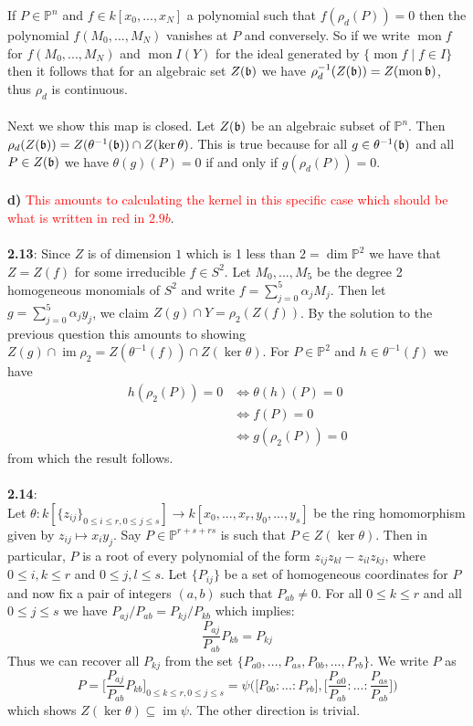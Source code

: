 \documentclass[12pt]{article}
\numberwithin{thm}{subsection}
\numberwithin{defn}{subsection}
\numberwithin{lemma}{subsection}
\numberwithin{example}{subsection}
\numberwithin{notation}{subsection}
\numberwithin{cor}{subsection}
\numberwithin{remark}{subsection}
\numberwithin{condition}{subsection}
\numberwithin{question}{subsection}
\numberwithin{construction}{subsection}
\numberwithin{construction}{subsection}
\numberwithin{construction}{subsection}
\newcommand{\bb}[1]{\mathbb{#1}}
\newcommand{\lto}{\longrightarrow}
\newcommand{\im}{\operatorname{im}}
\begin{document}
%
If $P \in \bb{P}^n$ and $f \in k[x_0,...,x_N]$ a polynomial such that $f(\rho_d(P)) = 0$ then the polynomial $f(M_0,...,M_N)$ vanishes at $P$ and conversely. So if we write $\operatorname{mon}f$ for $f(M_0,...,M_N)$ and $\operatorname{mon}I(Y)$ for the ideal generated by $\lbrace \operatorname{mon}f \mid f \in I \rbrace$ then it follows that for an algebraic set $Z(\frak{b})$ we have $\rho_d^{-1}(Z(\frak{b})) = Z(\operatorname{mon}\frak{b})$, thus $\rho_d$ is continuous.\\\\
%
Next we show this map is closed. Let $Z(\frak{b})$ be an algebraic subset of $\bb{P}^n$. Then $\rho_d(Z(\frak{b})) = Z(\theta^{-1}(\frak{b})) \cap Z(\ker \theta)$. This is true because for all $g \in \theta^{-1}(\frak{b})$ and all $P \in Z(\frak{b})$ we have $\theta(g)(P) = 0$ if and only if $g(\rho_d(P)) = 0$.\\\\
%
\textbf{d)} \textcolor{red}{This amounts to calculating the kernel in this specific case which should be what is written in red in $2.9b$}.\\\\
%
\textbf{2.13}: Since $Z$ is of dimension $1$ which is 1 less than $2 = \operatorname{dim}\bb{P}^2$ we have that $Z = Z(f)$ for some irreducible $f \in S^2$. Let $M_0,...,M_5$ be the degree 2 homogeneous monomials of $S^2$ and write $f = \sum_{j = 0}^5 \alpha_j M_j$. Then let $g = \sum_{j=0}^5\alpha_j y_j$, we claim $Z(g) \cap Y = \rho_2(Z(f))$. By the solution to the previous question this amounts to showing $Z(g) \cap \operatorname{im}\rho_2 = Z(\theta^{-1}(f)) \cap Z(\ker\theta)$. For $P \in \bb{P}^2$ and $h \in \theta^{-1}(f)$ we have
\begin{align*}
h(\rho_2(P)) = 0 &\Longleftrightarrow \theta(h)(P) = 0\\
& \Longleftrightarrow f(P) = 0\\
&\Longleftrightarrow g(\rho_2(P)) = 0
\end{align*}
from which the result follows.\\\\
%
\textbf{2.14}:\\
Let $\theta: k[\lbrace z_{ij}\rbrace_{0\leq i \leq r,0\leq j \leq s}] \lto k[x_0,...,x_r,y_0,...,y_s]$ be the ring homomorphism given by $z_{ij} \mapsto x_iy_j$. Say $P \in \bb{P}^{r + s + rs}$ is such that $P \in Z(\ker \theta)$. Then in particular, $P$ is a root of every polynomial of the form $z_{ij}z_{kl} - z_{il}z_{kj}$, where $0\leq i,k\leq r$ and $0\leq j,l\leq s$. Let $\lbrace P_{ij}\rbrace$ be a set of homogeneous coordinates for $P$ and now fix a pair of integers $(a,b)$ such that $P_{ab} \neq 0$. For all $0 \leq k\leq r$ and all $0 \leq j \leq s$ we have $P_{aj}/P_{ab} = P_{kj}/P_{kb}$ which implies:
\[\frac{P_{aj}}{P_{ab}}P_{kb} = P_{kj}\]
Thus we can recover all $P_{kj}$ from the set $\lbrace P_{a0},...,P_{as},P_{0b},...,P_{rb}\rbrace$. We write $P$ as
\[P = \Big[\frac{P_{aj}}{P_{ab}}P_{kb}\Big]_{0 \leq k \leq r, 0 \leq j \leq s} = \psi\Big(\big[P_{0b}:...:P_{rb}\big], \big[\frac{P_{a0}}{P_{ab}}:...:\frac{P_{as}}{P_{ab}}\big]\Big)\]
which shows $Z(\ker \theta) \subseteq \im \psi$. The other direction is trivial.\\\\
\end{document}

